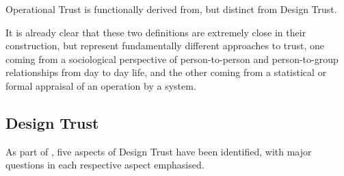 Operational Trust is functionally derived from, but distinct from Design Trust.

It is already clear that these two definitions are extremely close in their construction, but represent fundamentally different approaches to trust, one coming from a sociological perspective of person-to-person and person-to-group relationships from day to day life, and the other coming from a statistical or formal appraisal of an operation by a system.



\subsection{Design Trust}\label{sec:design_trust}

As part of \cite{Bolster2014a}, five aspects of Design Trust have been identified, with major questions in each respective aspect emphasised.

